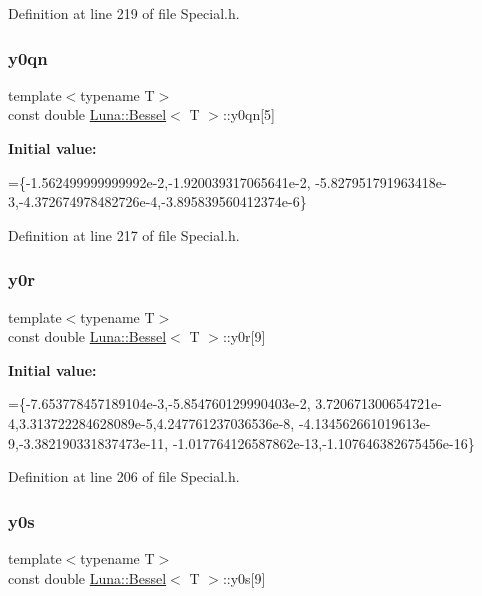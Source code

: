 Definition at line 219 of file Special.\+h.

\mbox{\label{structLuna_1_1Bessel_a1bcf2ab4b0bfdbf914cc33cb9f6f22be}} 
\subsubsection{\texorpdfstring{y0qn}{y0qn}}
{\footnotesize\ttfamily template$<$typename T$>$ \\
const double \hyperlink{structLuna_1_1Bessel}{Luna\+::\+Bessel}$<$ T $>$\+::y0qn\mbox{[}5\mbox{]}}

{\bfseries Initial value\+:}
\begin{DoxyCode}
=\{-1.562499999999992e-2,-1.920039317065641e-2,
        -5.827951791963418e-3,-4.372674978482726e-4,-3.895839560412374e-6\}
\end{DoxyCode}


Definition at line 217 of file Special.\+h.

\mbox{\label{structLuna_1_1Bessel_a66915e7a2dd7ef9b2eee1600b272d7a9}} 
\subsubsection{\texorpdfstring{y0r}{y0r}}
{\footnotesize\ttfamily template$<$typename T$>$ \\
const double \hyperlink{structLuna_1_1Bessel}{Luna\+::\+Bessel}$<$ T $>$\+::y0r\mbox{[}9\mbox{]}}

{\bfseries Initial value\+:}
\begin{DoxyCode}
=\{-7.653778457189104e-3,-5.854760129990403e-2,
        3.720671300654721e-4,3.313722284628089e-5,4.247761237036536e-8,
        -4.134562661019613e-9,-3.382190331837473e-11,
        -1.017764126587862e-13,-1.107646382675456e-16\}
\end{DoxyCode}


Definition at line 206 of file Special.\+h.

\mbox{\label{structLuna_1_1Bessel_abff8e2375cf91f57fb3bb71a379f8c20}} 
\subsubsection{\texorpdfstring{y0s}{y0s}}
{\footnotesize\ttfamily template$<$typename T$>$ \\
const double \hyperlink{structLuna_1_1Bessel}{Luna\+::\+Bessel}$<$ T $>$\+::y0s\mbox{[}9\mbox{]}}

